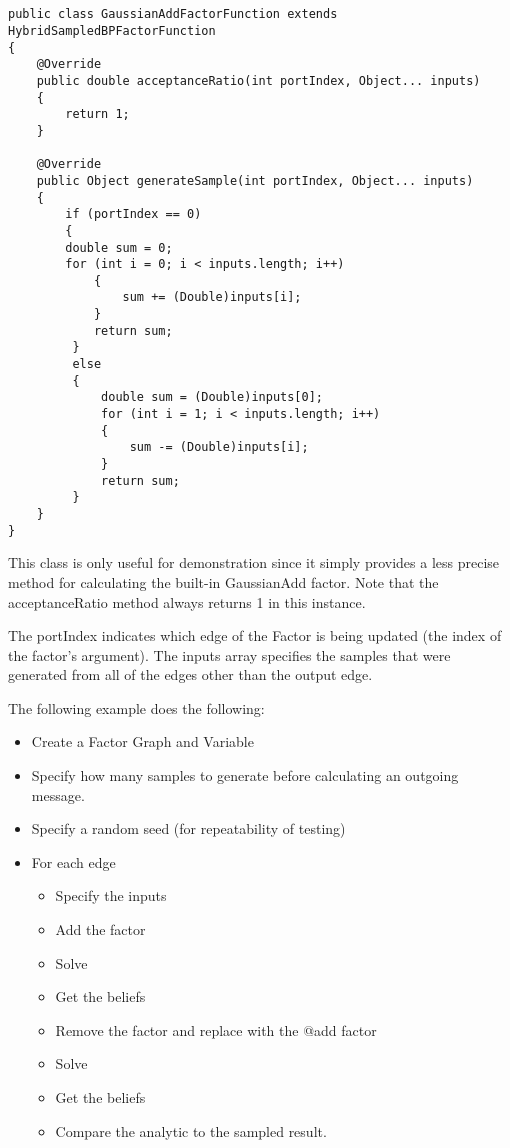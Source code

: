 \begin{lstlisting}


public class GaussianAddFactorFunction extends HybridSampledBPFactorFunction
{
    @Override
    public double acceptanceRatio(int portIndex, Object... inputs) 
    {
        return 1;
    }

    @Override
    public Object generateSample(int portIndex, Object... inputs) 
    {
        if (portIndex == 0)
        {
	    double sum = 0;
	    for (int i = 0; i < inputs.length; i++)
            {
                sum += (Double)inputs[i];
            }
            return sum;
         }
         else
         {
             double sum = (Double)inputs[0];
             for (int i = 1; i < inputs.length; i++)
             {
                 sum -= (Double)inputs[i];
             }
             return sum;
         }
    }
}
\end{lstlisting}


This class is only useful for demonstration since it simply provides a less precise method for calculating the built-in GaussianAdd factor. Note that the acceptanceRatio method always returns 1 in this instance.

The portIndex indicates which edge of the Factor is being updated (the index of the factor's argument). The inputs array specifies the samples that were generated from all of the edges other than the output edge.


The following example does the following:


\begin{itemize}
\item Create a Factor Graph and Variable
\item Specify how many samples to generate before calculating an outgoing message.
\item Specify a random seed (for repeatability of testing)
\item For each edge
\begin{itemize}
\item Specify the inputs
\item Add the factor
\item Solve
\item Get the beliefs
\item Remove the factor and replace with the @add factor
\item Solve
\item Get the beliefs
\item Compare the analytic to the sampled result.
\end{itemize}
\end{itemize}


